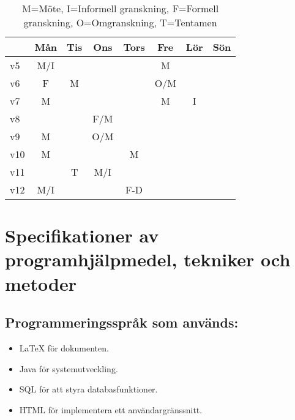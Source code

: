 \documentclass[paper=a4, fontsize=11pt,twoside]{article}
\begin{document}
\begin{table}[H]
\centering
\begin{tabular}{| l | c | c | c | c | c | c | c |}
\hline
& Mån & Tis & Ons & Tors & Fre & Lör & Sön \\
\hline
v5 & M/I & & & & M & & \\
\hline
v6 & F & M & & & O/M & & \\
\hline
v7 & M & & & & M & I & \\
\hline
v8 &  &  & F/M & & & & \\
\hline
v9 & M &  & O/M & &  & & \\
\hline
v10 & M & & & M &  & & \\
\hline
v11 &  & T & M/I & &  & & \\
\hline
v12 & M/I &  & & F-D & & & \\
\hline
\end{tabular}
{ \fontsize{6pt}{0.2cm}\selectfont \caption{M=Möte, I=Informell granskning, F=Formell granskning, O=Omgranskning, T=Tentamen}}
\end{table}





\section{Specifikationer av programhjälpmedel, tekniker och metoder}

\subsection*{Programmeringsspråk som används:}
	\begin{itemize}
	\item LaTeX för dokumenten.
	\item Java för systemutveckling.
	\item SQL för att styra databasfunktioner.
	\item HTML för implementera ett användargränssnitt.
	\end{itemize}
\end{document}
